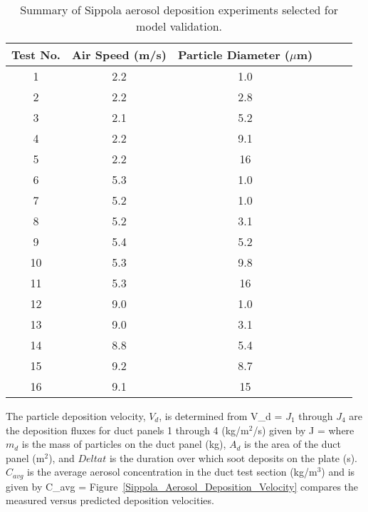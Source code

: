 \begin{table}[h!]
\caption{Summary of Sippola aerosol deposition experiments selected for model validation.}
\begin{center}
\begin{tabular}{|c|c|c|c|c|c|}
\hline
Test No.  &  Air Speed (m/s)  &  Particle Diameter ($\mu$m)  \\ \hline \hline
1         &  2.2              &  1.0                         \\ \hline
2         &  2.2              &  2.8                         \\ \hline
3         &  2.1              &  5.2                         \\ \hline
4         &  2.2              &  9.1                         \\ \hline
5         &  2.2              &  16                          \\ \hline
6         &  5.3              &  1.0                         \\ \hline
7         &  5.2              &  1.0                         \\ \hline
8         &  5.2              &  3.1                         \\ \hline
9         &  5.4              &  5.2                         \\ \hline
10        &  5.3              &  9.8                         \\ \hline
11        &  5.3              &  16                          \\ \hline
12        &  9.0              &  1.0                         \\ \hline
13        &  9.0              &  3.1                         \\ \hline
14        &  8.8              &  5.4                         \\ \hline
15        &  9.2              &  8.7                         \\ \hline
16        &  9.1              &  15                          \\ \hline
\end{tabular}
\end{center}
\label{Sippola_Aerosol_Deposition_Summary}
\end{table}

The particle deposition velocity, $V_d$, is determined from
\be 
   V_d =  
\ee
$J_1$ through $J_4$ are the deposition fluxes for duct panels 1 through 4 (kg/m$^2$/s) given by
\be 
   J =  
\ee
where $m_d$ is the mass of particles on the duct panel (kg), $A_d$ is the area of the duct panel (m$^2$),
and $Delta t$ is the duration over which soot deposits on the plate (s). $C_{avg}$ is the average aerosol
concentration in the duct test section (kg/m$^3$) and is given by
\be 
   C_{avg} =  
\ee
Figure~\ref{Sippola_Aerosol_Deposition_Velocity} compares the measured versus predicted deposition velocities.

